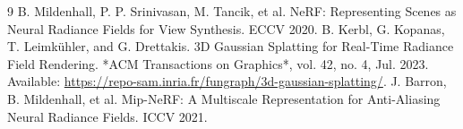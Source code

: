 \documentclass[10pt,letterpaper]{article}
\begin{document}
	
	
	\begin{thebibliography}{9}
		 B. Mildenhall, P. P. Srinivasan, M. Tancik, et al. NeRF: Representing Scenes as Neural Radiance Fields for View Synthesis. ECCV 2020.
		 B. Kerbl, G. Kopanas, T. Leimkühler, and G. Drettakis. 3D Gaussian Splatting for Real-Time Radiance Field Rendering. *ACM Transactions on Graphics*, vol. 42, no. 4, Jul. 2023. Available: \url{https://repo-sam.inria.fr/fungraph/3d-gaussian-splatting/}.		
		 J. Barron, B. Mildenhall, et al. Mip-NeRF: A Multiscale Representation for Anti-Aliasing Neural Radiance Fields. ICCV 2021.
		
	\end{thebibliography}
	
\end{document}
